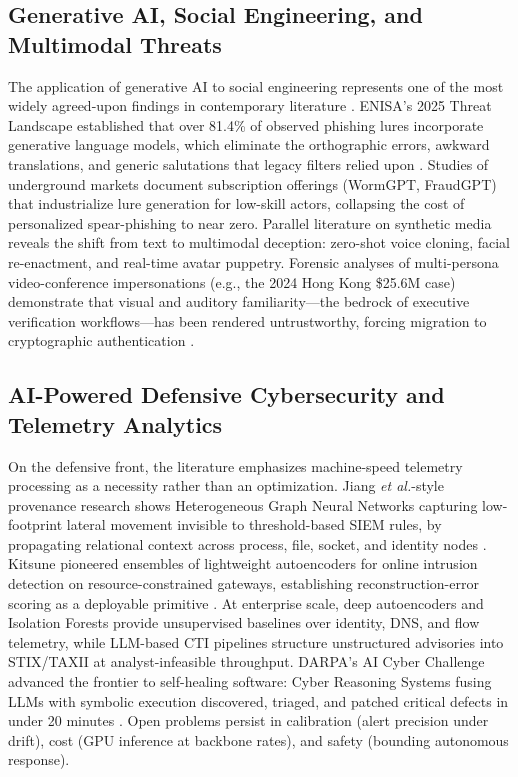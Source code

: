 \documentclass[conference,10pt,twocolumn,a4paper]{IEEEtran}
\begin{document}
\subsection{Generative AI, Social Engineering, and Multimodal Threats}
The application of generative AI to social engineering represents one of the most widely agreed-upon findings in contemporary literature \cite{enisa_etl_2025, slashnext_genai_2025}. ENISA's 2025 Threat Landscape established that over 81.4\% of observed phishing lures incorporate generative language models, which eliminate the orthographic errors, awkward translations, and generic salutations that legacy filters relied upon \cite{enisa_etl_2025}. Studies of underground markets document subscription offerings (WormGPT, FraudGPT) that industrialize lure generation for low-skill actors, collapsing the cost of personalized spear-phishing to near zero. Parallel literature on synthetic media reveals the shift from text to multimodal deception: zero-shot voice cloning, facial re-enactment, and real-time avatar puppetry. Forensic analyses of multi-persona video-conference impersonations (e.g., the 2024 Hong Kong \$25.6M case) demonstrate that visual and auditory familiarity---the bedrock of executive verification workflows---has been rendered untrustworthy, forcing migration to cryptographic authentication \cite{hkpf_deepfake_case_2024, fbi_deepfakes_bec_2025}.

\subsection{AI-Powered Defensive Cybersecurity and Telemetry Analytics}
On the defensive front, the literature emphasizes machine-speed telemetry processing as a necessity rather than an optimization. Jiang \emph{et al.}-style provenance research shows Heterogeneous Graph Neural Networks capturing low-footprint lateral movement invisible to threshold-based SIEM rules, by propagating relational context across process, file, socket, and identity nodes \cite{jiang2024provenance, mirsky2018kitsune}. Kitsune pioneered ensembles of lightweight autoencoders for online intrusion detection on resource-constrained gateways, establishing reconstruction-error scoring as a deployable primitive \cite{mirsky2018kitsune}. At enterprise scale, deep autoencoders and Isolation Forests provide unsupervised baselines over identity, DNS, and flow telemetry, while LLM-based CTI pipelines structure unstructured advisories into STIX/TAXII at analyst-infeasible throughput. DARPA's AI Cyber Challenge advanced the frontier to self-healing software: Cyber Reasoning Systems fusing LLMs with symbolic execution discovered, triaged, and patched critical defects in under 20 minutes \cite{darpa_aixcc_2025}. Open problems persist in calibration (alert precision under drift), cost (GPU inference at backbone rates), and safety (bounding autonomous response).
\end{document}
